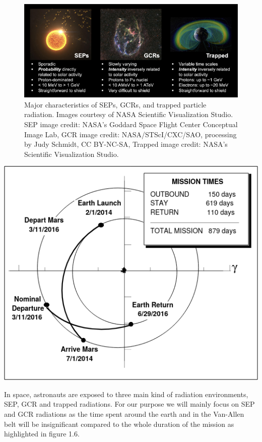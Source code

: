 \documentclass[12pt,a4paper]{report}
\begin{document}
\begin{figure}[hbtp]
\centering
\includegraphics[scale=1]{img/Major characteristics of SEPs GCRs and trapped particle radiation.jpg}
\caption{Major characteristics of SEPs, GCRs, and trapped particle radiation. Images courtesy of NASA Scientific Visualization Studio. SEP image credit: NASA’s Goddard Space
Flight Center Conceptual Image Lab, GCR image credit: NASA/STScI/CXC/SAO, processing by Judy Schmidt, CC BY-NC-SA, Trapped image credit: NASA’s Scientific Visualization
Studio.}
\end{figure}




\begin{minipage}[b]{0.5\linewidth}
\centering
\includegraphics[scale=.4]{img/optimised traj.png}
\end{minipage} 
\hfill
\begin{minipage}[b]{0.35\linewidth}
In space, astronauts are exposed to three main kind of radiation environments, SEP, GCR and trapped radiations. For our purpose we will mainly focus on SEP and GCR radiations as the time spent around the earth and in the Van-Allen belt will be insignificant compared to the whole duration of the mission as highlighted in figure 1.6.
\end{minipage}
\end{document}
